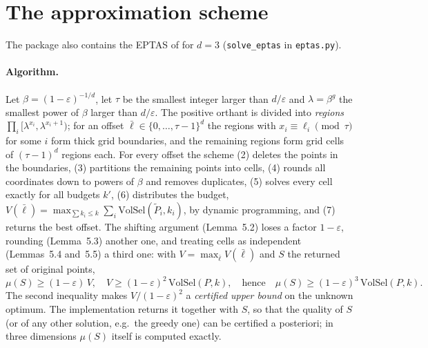 \documentclass[12pt,a4paper]{article}
\newcommand{\code}[1]{\texttt{#1}}
\begin{document}
\section{The approximation scheme}
\label{sec:eptas}
The package also contains the EPTAS of \cite[Section~5]{BCE} for $d=3$ (\code{solve\_eptas} in
\code{eptas.py}).

\paragraph{Algorithm.}
Let $\beta=(1-\varepsilon)^{-1/d}$, let $\tau$ be the smallest integer larger than $d/\varepsilon$ and
$\lambda=\beta^{g}$ the smallest power of $\beta$ larger than $d/\varepsilon$.  The positive orthant is divided into
\emph{regions} $\prod_i[\lambda^{x_i},\lambda^{x_i+1})$; for an offset $\bar\ell\in\{0,\dots,\tau-1\}^d$ the regions
with $x_i\equiv\ell_i \pmod\tau$ for some $i$ form thick grid boundaries, and the remaining regions form grid cells of
$(\tau-1)^d$ regions each.  For every offset the scheme (2) deletes the points in the boundaries, (3) partitions the
remaining points into cells, (4) rounds all coordinates down to powers of $\beta$ and removes duplicates, (5) solves
every cell exactly for all budgets $k'$, (6) distributes the budget, $V(\bar\ell)=\max_{\sum k_i\le k}\sum_i
\mathrm{VolSel}(\tilde P_i,k_i)$, by dynamic programming, and (7) returns the best offset.  The shifting argument
(Lemma~5.2) loses a factor $1-\varepsilon$, rounding (Lemma~5.3) another one, and treating cells as independent
(Lemmas~5.4 and~5.5) a third one: with $V=\max_{\bar\ell}V(\bar\ell)$ and $S$ the returned set of original points,
\begin{equation}\label{eq:eptas}
  \mu(S)\ge(1-\varepsilon)\,V,\quad V\ge(1-\varepsilon)^2\,\mathrm{VolSel}(P,k),
  \quad\text{hence}\quad \mu(S)\ge(1-\varepsilon)^3\,\mathrm{VolSel}(P,k).
\end{equation}
The second inequality makes $V/(1-\varepsilon)^2$ a \emph{certified upper bound} on the unknown optimum.  The
implementation returns it together with $S$, so that the quality of $S$ (or of any other solution, e.g.\ the greedy
one) can be certified a posteriori; in three dimensions $\mu(S)$ itself is computed exactly.
\end{document}
